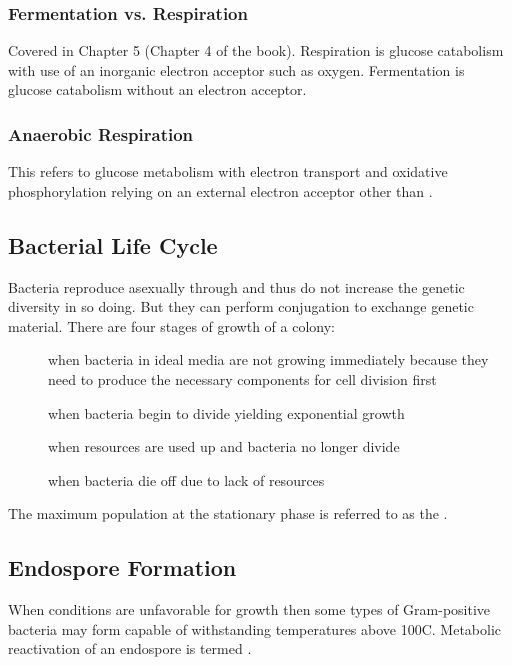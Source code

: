 \documentclass[../Bio_chemistryReview.tex]{subfiles}
\begin{document}
\subsubsection{Fermentation vs. Respiration}
Covered in Chapter 5 (Chapter 4 of the book). Respiration is glucose catabolism
with use of an inorganic electron acceptor such as oxygen. Fermentation is
glucose catabolism without an electron acceptor. 

\subsubsection{Anaerobic Respiration}
This refers to glucose metabolism with electron transport and oxidative
phosphorylation relying on an external electron acceptor other than
.

\subsection{Bacterial Life Cycle}
Bacteria reproduce asexually through  and thus do not
increase the genetic diversity in so doing. But they can perform conjugation to
exchange genetic material. There are four stages of growth of a colony:
\begin{description}
    \item[] when bacteria in ideal media are not growing
        immediately because they need to produce the necessary components for
        cell division first
    \item[]  when bacteria begin to divide yielding
        exponential growth
    \item[] when resources are used up and bacteria no
        longer divide
    \item[] when bacteria die off due to lack of resources
\end{description}
The maximum population at the stationary phase is referred to as the
.

\subsection{Endospore Formation}
When conditions are unfavorable for growth then some types of Gram-positive
bacteria may form  capable of withstanding temperatures
above 100C. Metabolic reactivation of an endospore is termed
.
\end{document}
